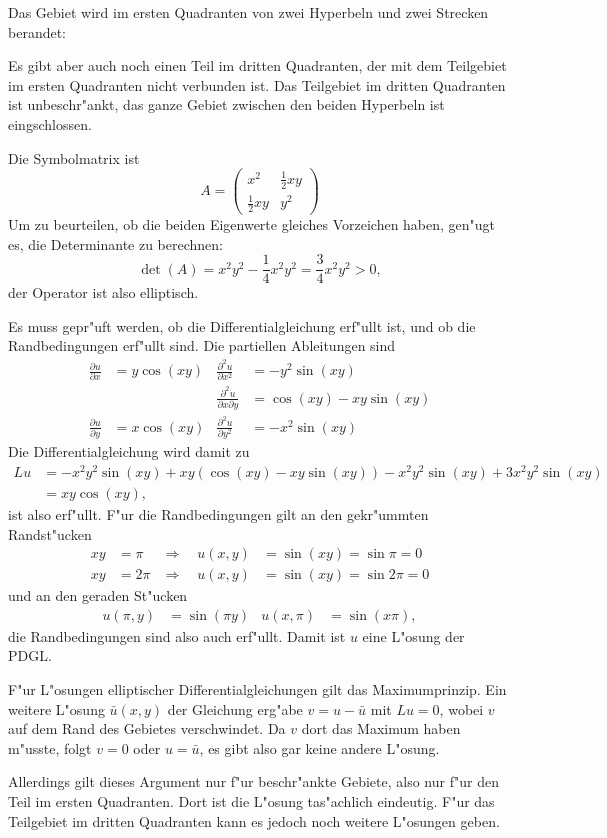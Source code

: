 \begin{loesung}
\begin{teilaufgaben}
\item
Das Gebiet wird im ersten Quadranten von zwei Hyperbeln und zwei Strecken berandet:
\begin{center}
\end{center}
Es gibt aber auch noch einen Teil im dritten Quadranten, der mit dem Teilgebiet
im ersten Quadranten nicht verbunden ist. Das Teilgebiet im
dritten Quadranten ist unbeschr"ankt, das ganze Gebiet zwischen
den beiden Hyperbeln ist eingschlossen.
\item
Die Symbolmatrix ist
\[
A=\begin{pmatrix}
x^2&\frac12xy\\
\frac12xy&y^2
\end{pmatrix}
\]
Um zu beurteilen, ob die beiden Eigenwerte gleiches Vorzeichen haben,
gen"ugt es, die Determinante zu berechnen:
\[
\det(A)=x^2y^2-\frac14x^2y^2=\frac34x^2y^2>0,
\]
der Operator ist also elliptisch.
\item
Es muss gepr"uft werden, ob die Differentialgleichung erf"ullt ist,
und ob die Randbedingungen erf"ullt sind.
Die partiellen Ableitungen sind
\begin{align*}
\frac{\partial u}{\partial x}&=y\cos(xy)
&
\frac{\partial^2 u}{\partial x^2}&=-y^2\sin(xy)
\\
&&\frac{\partial^2 u}{\partial x\partial y}&=\cos(xy)-xy\sin(xy)
\\
\frac{\partial u}{\partial y}&=x\cos(xy)
&
\frac{\partial^2 u}{\partial y^2}&=-x^2\sin(xy)
\end{align*}
Die Differentialgleichung wird damit zu
\begin{align*}
Lu&=-x^2y^2\sin(xy)+xy(\cos(xy)-xy\sin(xy))-x^2y^2\sin(xy)+3x^2y^2\sin(xy)\
\\
&=xy\cos(xy),
\end{align*}
ist also erf"ullt.
F"ur die Randbedingungen gilt an den gekr"ummten Randst"ucken
\begin{align*}
xy&=\pi&\Rightarrow\quad u(x,y)&=\sin(xy)=\sin\pi=0\\
xy&=2\pi&\Rightarrow\quad u(x,y)&=\sin(xy)=\sin2\pi=0
\end{align*}
und an den geraden St"ucken
\begin{align*}
u(\pi,y)&=\sin(\pi y)
&u(x,\pi)&=\sin(x\pi),
\end{align*}
die Randbedingungen
sind also auch erf"ullt. Damit ist $u$ eine L"osung der PDGL.
\item
F"ur L"osungen elliptischer Differentialgleichungen gilt das Maximumprinzip.
Ein weitere L"osung $\bar u(x,y)$ der Gleichung erg"abe
$v=u-\bar u$ mit
$Lu=0$, wobei $v$ auf dem Rand des Gebietes verschwindet.
Da $v$ dort das Maximum haben m"usste, folgt $v=0$ oder $u=\bar u$,
es gibt also gar keine andere L"osung.

Allerdings gilt dieses Argument nur f"ur beschr"ankte Gebiete, also nur
f"ur den Teil im ersten Quadranten. Dort ist die L"osung tas"achlich
eindeutig. F"ur das Teilgebiet im dritten Quadranten kann es
jedoch noch weitere L"osungen geben.
\end{teilaufgaben}
\end{loesung}

